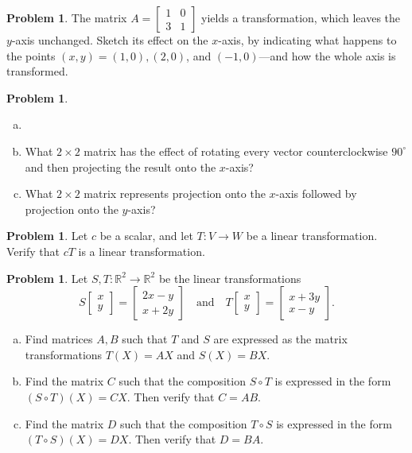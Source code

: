 \documentclass[10pt]{article}
\theoremstyle{definition}
\newtheorem{problem}[theorem]{Problem}
\newcommand{\1}[1]{\textbf{1}_{\left[#1\right]}} %
\def\R{\mathbb{R}} %
\newcommand{\dempfcolor}[1]{{\color{RoyalBlue}#1}}
\newcommand{\demph}[1]{\dempfcolor{{\sl #1}}}
\begin{document}
\begin{problem}
  The matrix $A=
  \begin{bmatrix}
    1&0\\
    3&1
  \end{bmatrix}
  $ yields a \demph{shearing} transformation, which leaves the $y$-axis
  unchanged. Sketch its effect on the $x$-axis, by indicating what happens to
  the points $(x,y)= (1,0),(2,0)$, and $(-1,0)$---and how the whole axis is
  transformed.
\end{problem}

\begin{problem}
  \begin{enumerate}[(a)]
    \item[]
    \item What $2\times 2$ matrix has the effect of rotating every vector
    counterclockwise $90^{\circ}$ and then projecting the result onto the
    $x$-axis?
    \item What $2\times 2$ matrix represents projection onto the $x$-axis
    followed by projection onto the $y$-axis?
  \end{enumerate}
\end{problem}

\begin{problem}
  Let $c$ be a scalar, and let $T:V \to W$ be a linear transformation. Verify
  that $cT$ is a linear transformation.
\end{problem}


\begin{problem}
  Let $S,T:\R^{2} \to \R^{2}$ be the linear transformations
  \begin{equation*}
    S
    \begin{bmatrix}
      x\\y
    \end{bmatrix}
    =
    \begin{bmatrix}
      2x-y\\x+2y
    \end{bmatrix}
    \quad \text{and} \quad
    T
    \begin{bmatrix}
      x\\y
    \end{bmatrix}
    =
    \begin{bmatrix}
      x+3y\\x-y
    \end{bmatrix}.
  \end{equation*}
  \begin{enumerate}[(a)]
    \item Find matrices $A,B$ such that $T$ and $S$ are expressed as the
    matrix transformations $T(X)=AX$ and $S(X) = BX$.
    \item Find the matrix $C$ such that the composition $S\circ T$ is
    expressed in the form $(S\circ T)(X)=CX$. Then verify that $C=AB$.
    \item Find the matrix $D$ such that the composition $T\circ S$ is
    expressed in the form $(T\circ S)(X)=DX$. Then verify that $D=BA$.
  \end{enumerate}
\end{problem}
\end{document}
